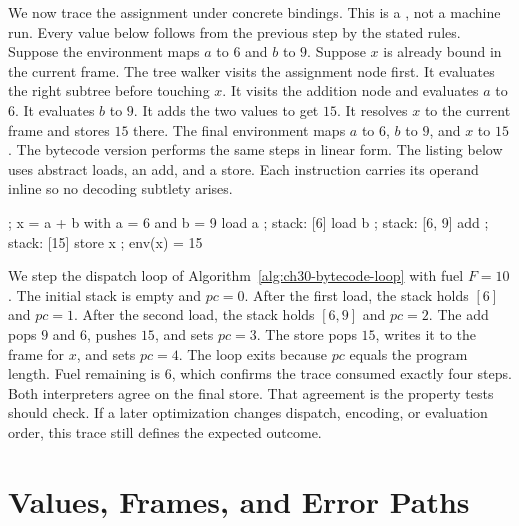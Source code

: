 We now trace the assignment  under concrete bindings.
This is a , not a machine run.
Every value below follows from the previous step by the stated rules.
Suppose the environment maps $a$ to $6$ and $b$ to $9$.
Suppose $x$ is already bound in the current frame.
The tree walker visits the assignment node first.
It evaluates the right subtree before touching $x$.
It visits the addition node and evaluates $a$ to $6$.
It evaluates $b$ to $9$.
It adds the two values to get $15$.
It resolves $x$ to the current frame and stores $15$ there.
The final environment maps $a$ to $6$, $b$ to $9$, and $x$ to $15$.
The bytecode version performs the same steps in linear form.
The listing below uses abstract loads, an add, and a store.
Each instruction carries its operand inline so no decoding subtlety arises.
\begin{irlisting}
; x = a + b with a = 6 and b = 9
load a        ; stack: [6]
load b        ; stack: [6, 9]
add           ; stack: [15]
store x       ; env(x) = 15
\end{irlisting}
We step the dispatch loop of Algorithm~\ref{alg:ch30-bytecode-loop} with fuel $F = 10$.
The initial stack is empty and $pc = 0$.
After the first load, the stack holds $[6]$ and $pc = 1$.
After the second load, the stack holds $[6, 9]$ and $pc = 2$.
The add pops $9$ and $6$, pushes $15$, and sets $pc = 3$.
The store pops $15$, writes it to the frame for $x$, and sets $pc = 4$.
The loop exits because $pc$ equals the program length.
Fuel remaining is $6$, which confirms the trace consumed exactly four steps.
Both interpreters agree on the final store.
That agreement is the property tests should check.
If a later optimization changes dispatch, encoding, or evaluation order, this trace still defines the expected outcome.

\section{Values, Frames, and Error Paths}\label{sec:ch30-values}

